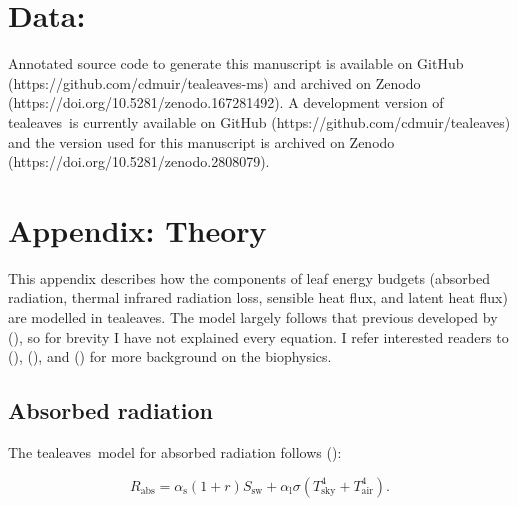 \documentclass[11pt, oneside]{article}
\newcommand{\pkg}[1]{{\fontseries{b}\selectfont #1}}
\newcommand{\tealeaves}{\pkg{tealeaves}}
\begin{document}
\section*{Data:}  

Annotated source code to generate this manuscript is available on GitHub (https://github.com/cdmuir/tealeaves-ms) and archived on Zenodo (https://doi.org/10.5281/zenodo.167281492). A development version of \tealeaves~is currently available on GitHub (https://github.com/cdmuir/tealeaves) and the version used for this manuscript is archived on Zenodo (https://doi.org/10.5281/zenodo.2808079).





\clearpage


\section*{Appendix: Theory}

This appendix describes how the components of leaf energy budgets (absorbed radiation, thermal infrared radiation loss, sensible heat flux, and latent heat flux) are modelled in \tealeaves. The model largely follows that previous developed by \citeauthor{Foster_Smith_1986} (\citeyear{Foster_Smith_1986}), so for brevity I have not explained every equation. I refer interested readers to \citeauthor{Nobel_2009} (\citeyear{Nobel_2009}), \citeauthor{Monteith_Unsworth_2013} (\citeyear{Monteith_Unsworth_2013}), and \citeauthor{Jones_2014} (\citeyear{Jones_2014}) for more background on the biophysics.

\subsection*{Absorbed radiation}

The \tealeaves~model for absorbed radiation follows \citeauthor{Okajima_etal_2012} (\citeyear{Okajima_etal_2012}):

\begin{equation}
  R_\mathrm{abs} = \alpha_\mathrm{s} (1 + r) S_\mathrm{sw} + \alpha_\mathrm{l} \sigma (T_\mathrm{sky} ^ 4 + T_\mathrm{air} ^ 4).
\end{equation}
\end{document}
